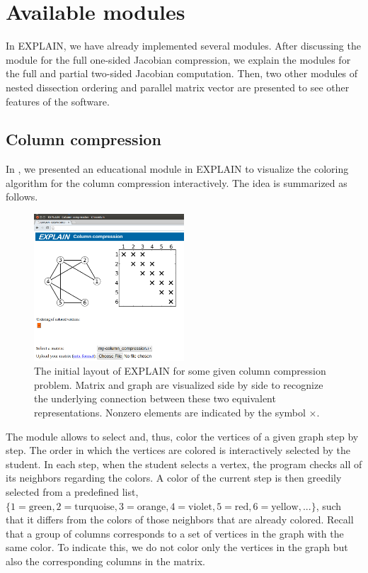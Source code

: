 \documentclass[12pt, twoside,a4paper,toc=bibliography]{scrbook}
\begin{document}
\section{Available modules}
\label{s.av.modules}
In \mbox{EXPLAIN}, we have already implemented several modules.
After discussing the module for the full one-sided Jacobian compression,
we explain the modules for the full and partial two-sided Jacobian computation. 
Then, two other modules of nested dissection ordering and parallel matrix vector
are presented to see other features of the software.
\subsection{Column compression}
\label{s.column-compression}
In \cite{2013:05,2014:01}, we presented an educational module in \mbox{EXPLAIN} to visualize the
coloring algorithm for the column compression interactively. The idea is
summarized as follows.

\begin{figure}
\centering
\includegraphics[width=0.5\textwidth]{fig1.png}
\caption{The initial layout of EXPLAIN for some given column compression problem. Matrix and graph are visualized side by side to recognize the underlying connection between these two equivalent representations. Nonzero elements are indicated by the symbol $\times$.}
\label{fig1}
\end{figure}
The module allows to select and, thus, color the vertices of a given graph step by step. The order in which the vertices are colored is interactively selected by the student. In each step, when the student selects a vertex, the program checks all of its neighbors regarding the colors. A color of the current step is then greedily selected from a predefined list, $\{1=\text{green}, 2=\text{turquoise}, 3=\text{orange}, 4=\text{violet}, 5=\text{red}, 6=\text{yellow}, ...\}$, such that it differs from the colors of those neighbors that are already colored. Recall that a group of columns corresponds to a set of vertices in the graph with the same color. To indicate this, we do not color only the vertices in the graph but also the corresponding columns in the matrix.
\end{document}
